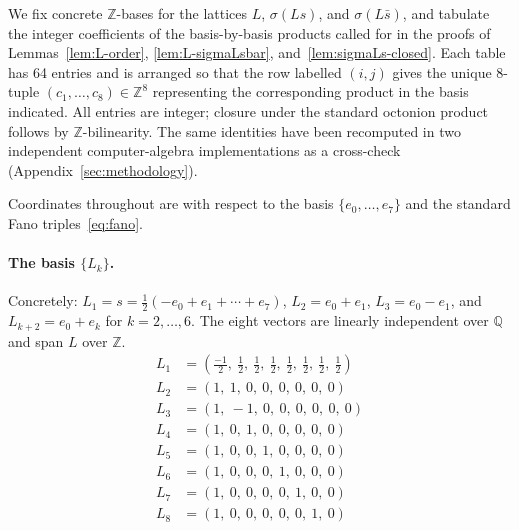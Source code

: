 \documentclass[twoside,english]{paper}
\numberwithin{equation}{section}
\numberwithin{figure}{section}
\theoremstyle{definition}
\theoremstyle{remark}
\newcommand{\QQ}{\mathbb{Q}}
\newcommand{\ZZ}{\mathbb{Z}}
\begin{document}
We fix concrete $\ZZ$-bases for the lattices $L$, $\sigma(Ls)$, and
$\sigma(L\bar s)$, and tabulate the integer coefficients of the
basis-by-basis products called for in the proofs of
Lemmas~\ref{lem:L-order}, \ref{lem:L-sigmaLsbar},
and~\ref{lem:sigmaLs-closed}.  Each table has 64 entries and is
arranged so that the row labelled $(i,j)$ gives the unique 8-tuple
$(c_1,\ldots,c_8) \in \ZZ^8$ representing the corresponding product
in the basis indicated.  All entries are integer; closure under the
standard octonion product follows by $\ZZ$-bilinearity.  The same
identities have been recomputed in two independent computer-algebra
implementations as a cross-check
(Appendix~\ref{sec:methodology}).

Coordinates throughout are with respect to the basis
$\{e_0,\ldots,e_7\}$ and the standard Fano triples~\eqref{eq:fano}.

\paragraph{The basis $\{L_k\}$.} Concretely: $L_1 = s = \tfrac12(-e_0+e_1+\cdots+e_7)$, $L_2 = e_0+e_1$, $L_3 = e_0-e_1$, and $L_{k+2} = e_0+e_k$ for $k=2,\ldots,6$. The eight vectors are linearly independent over $\QQ$ and span $L$ over $\ZZ$.
\begin{align*}
  L_{1} &= (\tfrac{-1}{2},\ \tfrac{1}{2},\ \tfrac{1}{2},\ \tfrac{1}{2},\ \tfrac{1}{2},\ \tfrac{1}{2},\ \tfrac{1}{2},\ \tfrac{1}{2}) \\
  L_{2} &= (1,\ 1,\ 0,\ 0,\ 0,\ 0,\ 0,\ 0) \\
  L_{3} &= (1,\ -1,\ 0,\ 0,\ 0,\ 0,\ 0,\ 0) \\
  L_{4} &= (1,\ 0,\ 1,\ 0,\ 0,\ 0,\ 0,\ 0) \\
  L_{5} &= (1,\ 0,\ 0,\ 1,\ 0,\ 0,\ 0,\ 0) \\
  L_{6} &= (1,\ 0,\ 0,\ 0,\ 1,\ 0,\ 0,\ 0) \\
  L_{7} &= (1,\ 0,\ 0,\ 0,\ 0,\ 1,\ 0,\ 0) \\
  L_{8} &= (1,\ 0,\ 0,\ 0,\ 0,\ 0,\ 1,\ 0)
\end{align*}
\end{document}
